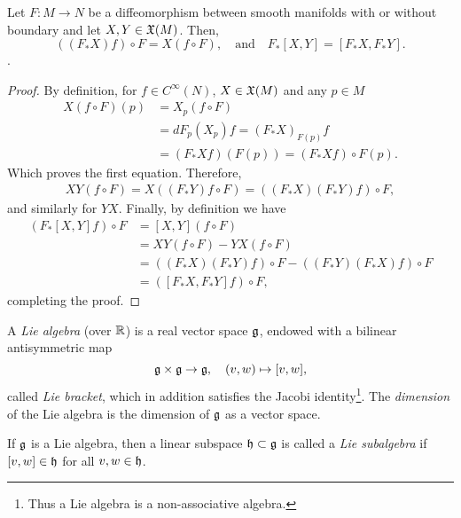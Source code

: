 \begin{theorem}\label{thm:liealgiso}
  Let $F:M\to N$ be a diffeomorphism between smooth manifolds with or without boundary and let $X, Y \in\mathfrak{X}(M)$. Then,
  \begin{equation}
    \left((F_* X)f\right)\circ F = X(f\circ F), \quad\mbox{and}\quad
    F_* [X,Y] = [F_* X, F_* Y].
  \end{equation}.
\end{theorem}
\begin{proof}
  By definition, for $f\in C^\infty(N)$, $X\in\mathfrak{X}(M)$ and any $p\in M$
  \begin{align}
    X(f\circ F)(p) &= X_p(f\circ F) \\
    &= dF_p(X_p)f = (F_* X)_{F(p)}f \\
    &= (F_*X f)(F(p)) = (F_*X f)\circ F(p).
  \end{align}
  Which proves the first equation.
  Therefore,
  \begin{align}
    X Y (f\circ F) = X ((F_* Y) f \circ F) 
    = ((F_* X) (F_* Y) f) \circ F,
  \end{align}
  and similarly for $Y X$.
  Finally, by definition we have
  \begin{align}
    (F_* [X,Y] f)\circ F
    &= [X,Y](f\circ F) \\
    &= XY (f\circ F) - YX (f\circ F) \\
    &= ((F_* X) (F_* Y)f)\circ F - ((F_* Y) (F_* X)f)\circ F\\
    &= ([F_* X, F_* Y]f)\circ F,
  \end{align}
  completing the proof.
\end{proof}

\begin{definition}
  A \emph{Lie algebra} (over $\mathbb{R}$) is a real vector space $\mathfrak{g}$, endowed with a bilinear antisymmetric map
  \begin{equation}
    \mathfrak{g} \times \mathfrak{g} \to \mathfrak{g}, \quad (v,w)\mapsto [v,w],
  \end{equation}
  called \emph{Lie bracket}, which in addition satisfies the Jacobi identity\footnote{Thus a Lie algebra is a non-associative algebra.}. 
  The \emph{dimension} of the Lie algebra is the dimension of $\mathfrak{g}$ as a vector space.

  If $\mathfrak{g}$ is a Lie algebra, then a linear subspace $\mathfrak{h}\subset\mathfrak{g}$ is called a \emph{Lie subalgebra} if $[v,w]\in\mathfrak{h}$ for all $v,w\in\mathfrak{h}$.
\end{definition}

